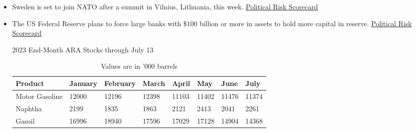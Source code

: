 \documentclass[12pt, a4paper]{article}
\begin{document}
\begin{itemize}
\begin{table}[h]
\end{table}


\item Sweden is set to join NATO after a summit in Vilnius, Lithuania, this week. \href{https://dimensionspira.spglobal.com/?pdf=gprsscorecard071323.pdf}{Political Risk Scorecard}
\\
\item The US Federal Reserve plans to force large banks with $\$100$ billion or more in assets to hold more capital in reserve.  \href{https://dimensionspira.spglobal.com/?pdf=gprsscorecard071323.pdf}{Political Risk Scorecard}
\\

\begin{table}[h]

2023 End-Month ARA Stocks through July 13\\

\begin{tabular}{l|lllllll}
\hline
\textbf{Product} & \textbf{January}              & \textbf{February}             & \textbf{March}                & \textbf{April}                & \textbf{May}                  & \textbf{June}                 & \textbf{July}                 \\
\hline
Motor   Gasoline & \cellcolor[HTML]{A6D9B5}12000 & \cellcolor[HTML]{85CC98}12196 & \cellcolor[HTML]{63BE7B}12398 & \cellcolor[HTML]{F8696B}11103 & \cellcolor[HTML]{FBDEE1}11402 & \cellcolor[HTML]{FCFCFF}11476 & \cellcolor[HTML]{FAD3D6}11374 \\
Naphtha          & \cellcolor[HTML]{D4ECDC}2199  & \cellcolor[HTML]{F8696B}1835  & \cellcolor[HTML]{F87779}1863  & \cellcolor[HTML]{FCFCFF}2121  & \cellcolor[HTML]{63BE7B}2413  & \cellcolor[HTML]{FAD2D5}2041  & \cellcolor[HTML]{B3DFC0}2261  \\
Gasoil                                   & \cellcolor[HTML]{FBFAFD}16996 & \cellcolor[HTML]{63BE7B}18940 & \cellcolor[HTML]{CFEAD8}17596 & \cellcolor[HTML]{FCFCFF}17029 & \cellcolor[HTML]{F5F9F9}17128 & \cellcolor[HTML]{F88688}14904 & \cellcolor[HTML]{F8696B}14368\\
\hline
\end{tabular}

\caption*{Values are in '000 barrels}

\end{table}

\end{itemize}
\end{document}
